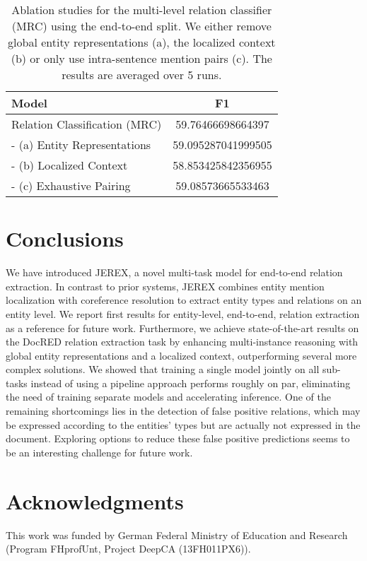 \documentclass[11pt,a4paper]{article}
\newcommand\name{JEREX}
\begin{document}
\begin{table}
\centering
\begin{tabular}{l S}
\toprule
    \textbf{Model} & {F1} \\ \midrule
    Relation Classification (MRC) & 59.76466698664397 \\
    - (a) Entity Representations & 59.095287041999505 \\
    - (b) Localized Context & 58.853425842356955 \\
    - (c) Exhaustive Pairing & 59.08573665533463 \\
     \bottomrule
\end{tabular}
\caption{Ablation studies for the multi-level relation classifier (MRC) using the end-to-end split. We either remove global entity representations (a), the localized context (b) or only use intra-sentence mention pairs (c). The results are averaged over 5 runs.} 
\label{table:ablations} 
\end{table}

\section{Conclusions}
We have introduced \name{}, a novel multi-task model for end-to-end relation extraction. In contrast to prior systems, \name{} combines entity mention localization with coreference resolution to extract entity types and relations on an entity level. We report first results for entity-level, end-to-end, relation extraction as a reference for future work. Furthermore, we achieve state-of-the-art results on the DocRED relation extraction task by enhancing multi-instance reasoning with global entity representations and a localized context, outperforming several more complex solutions. We showed that training a single model jointly on all sub-tasks instead of using a pipeline approach performs roughly on par, eliminating the need of training separate models and accelerating inference. One of the remaining shortcomings lies in the detection of false positive relations, which may be expressed according to the entities' types but are actually not expressed in the document. Exploring options to reduce these false positive predictions seems to be an interesting challenge for future work.

\section*{Acknowledgments}
This work was funded by German Federal Ministry of Education and Research (Program FHprofUnt, Project DeepCA (13FH011PX6)).



\end{document}

